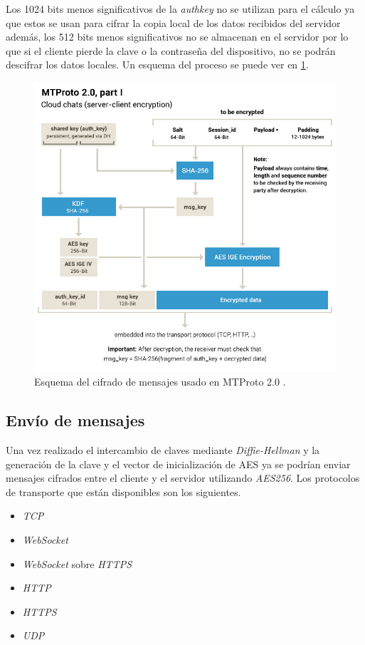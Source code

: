 Los 1024 bits menos significativos de la \emph{auth\textunderscore key} no se utilizan para el cálculo ya que estos se usan para cifrar la copia local de los datos recibidos del servidor además, los 512 bits menos significativos no se almacenan en el servidor por lo que si el cliente pierde la clave o la contraseña del dispositivo, no se podrán descifrar los datos locales. Un esquema del proceso se puede ver en \ref{mtproto2}.
\begin{figure}[htb]
	\centering
	\includegraphics[scale=0.4]{imagenes/diagramaMTProto.jpg} 
	\caption{Esquema del cifrado de mensajes usado en MTProto 2.0 \cite{WebProto}.}
	\label{mtproto2}
\end{figure}

\subsection{Envío de mensajes}
Una vez realizado el intercambio de claves mediante \emph{Diffie-Hellman} y la generación de la clave y el vector de inicialización de AES ya se podrían enviar mensajes cifrados entre el cliente y el servidor utilizando \emph{AES256}.
Los protocolos de transporte que están disponibles son los siguientes.
\begin{itemize}
	\item \emph{TCP}
	\item \emph{WebSocket}
	\item \emph{WebSocket} sobre \emph{HTTPS}
	\item \emph{HTTP}
	\item \emph{HTTPS}
	\item \emph{UDP}
\end{itemize}


